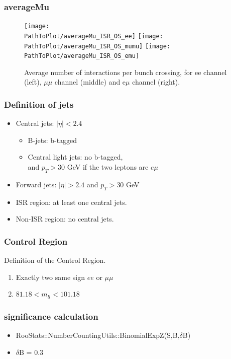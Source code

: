 \documentclass[mathserif,serif]{beamer}
\begin{document}
\def \PathToPlot {../plot}
\begin{frame}
\frametitle{averageMu}
\begin{figure}
\texttt{[image: \\PathToPlot/averageMu\_ISR\_OS\_ee]}
\texttt{[image: \\PathToPlot/averageMu\_ISR\_OS\_mumu]}
\texttt{[image: \\PathToPlot/averageMu\_ISR\_OS\_emu]} \\
\caption{Average number of interactions per bunch crossing, for ee channel (left), $\mu\mu$ channel (middle) and e$\mu$ channel (right).}
\end{figure}
\end{frame}

\begin{frame}
\frametitle{Definition of jets}
\normalsize
\begin{itemize}
\item Central jets: $|\eta|<2.4$
\begin{itemize}
\item B-jets: b-tagged
\item Central light jets: no b-tagged,\\
and $p_T>30$ GeV if the two leptons are $e\mu$
\end{itemize}
\item Forward jets: $|\eta|>2.4$ and $p_T>30$ GeV
\item ISR region: at least one central jets.
\item Non-ISR region: no central jets.
\end{itemize}
\end{frame}

\begin{frame}
\frametitle{Control Region}
Definition of the Control Region.
\begin{enumerate}
\item Exactly two same sign $ee$ or $\mu\mu$
\item $81.18 < m_{ll} < 101.18$
\end{enumerate}
\end{frame}

\begin{frame}
\frametitle{significance calculation}
\begin{itemize}
\item RooStats::NumberCountingUtils::BinomialExpZ(S,B,$\delta$B)
\item $\delta$B = 0.3
\end{itemize}
\end{frame}
\end{document}
